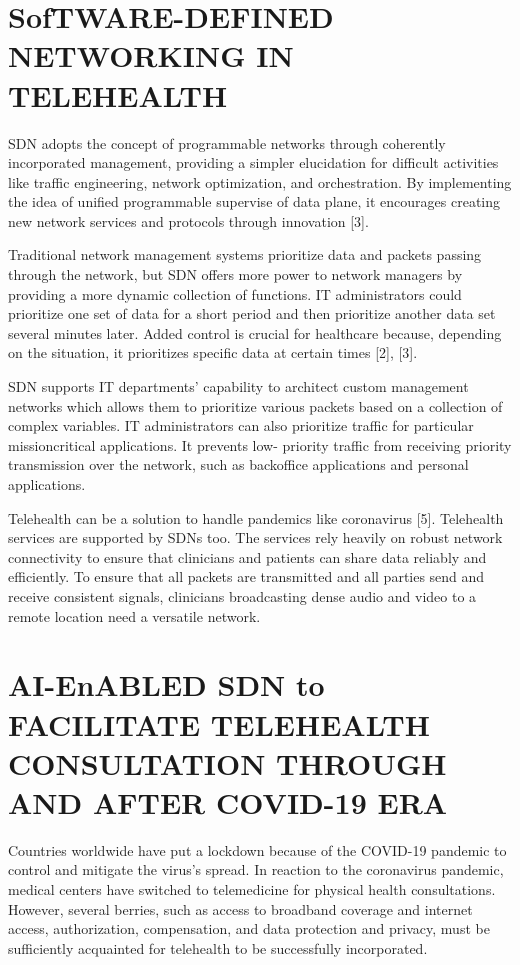 \documentclass[10pt]{article}
\begin{document}
\section{SofTWARE-DEFINED NETWORKING IN TELEHEALTH}
SDN adopts the concept of programmable networks through coherently incorporated management, providing a simpler elucidation for difficult activities like traffic engineering, network optimization, and orchestration. By implementing the idea of unified programmable supervise of data plane, it encourages creating new network services and protocols through innovation [3].

Traditional network management systems prioritize data and packets passing through the network, but SDN offers more power to network managers by providing a more dynamic collection of functions. IT administrators could prioritize one set of data for a short period and then prioritize another data set several minutes later. Added control is crucial for healthcare because, depending on the situation, it prioritizes specific data at certain times [2], [3].

SDN supports IT departments' capability to architect custom management networks which allows them to prioritize various packets based on a collection of complex variables. IT administrators can also prioritize traffic for particular missioncritical applications. It prevents low- priority traffic from receiving priority transmission over the network, such as backoffice applications and personal applications.

Telehealth can be a solution to handle pandemics like coronavirus [5]. Telehealth services are supported by SDNs too. The services rely heavily on robust network connectivity to ensure that clinicians and patients can share data reliably and efficiently. To ensure that all packets are transmitted and all parties send and receive consistent signals, clinicians broadcasting dense audio and video to a remote location need a versatile network.

\section{AI-EnABLED SDN to FACILITATE TELEHEALTH CONSULTATION THROUGH AND AFTER COVID-19 ERA}
Countries worldwide have put a lockdown because of the COVID-19 pandemic to control and mitigate the virus's spread. In reaction to the coronavirus pandemic, medical centers have switched to telemedicine for physical health consultations. However, several berries, such as access to broadband coverage and internet access, authorization, compensation, and data protection and privacy, must be sufficiently acquainted for telehealth to be successfully incorporated.
\end{document}
